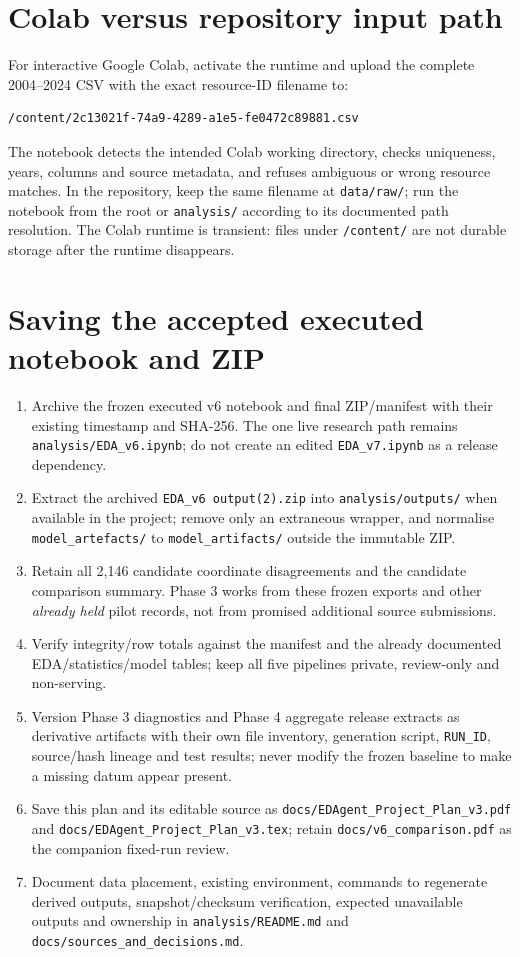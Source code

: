 \documentclass[11pt,a4paper,openany]{report}
\newcommand{\pathcode}[1]{\nolinkurl{#1}}
\begin{document}
\section{Colab versus repository input path}
For interactive Google Colab, activate the runtime and upload the complete 2004--2024 CSV with the exact resource-ID filename to:
\begin{lstlisting}
/content/2c13021f-74a9-4289-a1e5-fe0472c89881.csv
\end{lstlisting}
The notebook detects the intended Colab working directory, checks uniqueness, years, columns and source metadata, and refuses ambiguous or wrong resource matches. In the repository, keep the same filename at \pathcode{data/raw/}; run the notebook from the root or \pathcode{analysis/} according to its documented path resolution. The Colab runtime is transient: files under \pathcode{/content/} are not durable storage after the runtime disappears.

\section{Saving the accepted executed notebook and ZIP}
\begin{enumerate}
\item Archive the frozen executed v6 notebook and final ZIP/manifest with their existing timestamp and SHA-256. The one live research path remains \pathcode{analysis/EDA_v6.ipynb}; do not create an edited \pathcode{EDA_v7.ipynb} as a release dependency.
\item Extract the archived \pathcode{EDA_v6 output(2).zip} into \pathcode{analysis/outputs/} when available in the project; remove only an extraneous wrapper, and normalise \pathcode{model_artefacts/} to \pathcode{model_artifacts/} outside the immutable ZIP.
\item Retain all 2,146 candidate coordinate disagreements and the candidate comparison summary. Phase 3 works from these frozen exports and other \emph{already held} pilot records, not from promised additional source submissions.
\item Verify integrity/row totals against the manifest and the already documented EDA/statistics/model tables; keep all five pipelines private, review-only and non-serving.
\item Version Phase 3 diagnostics and Phase 4 aggregate release extracts as derivative artifacts with their own file inventory, generation script, \pathcode{RUN_ID}, source/hash lineage and test results; never modify the frozen baseline to make a missing datum appear present.
\item Save this plan and its editable source as \pathcode{docs/EDAgent_Project_Plan_v3.pdf} and \pathcode{docs/EDAgent_Project_Plan_v3.tex}; retain \pathcode{docs/v6_comparison.pdf} as the companion fixed-run review.
\item Document data placement, existing environment, commands to regenerate derived outputs, snapshot/checksum verification, expected unavailable outputs and ownership in \pathcode{analysis/README.md} and \pathcode{docs/sources_and_decisions.md}.
\end{enumerate}
\end{document}
